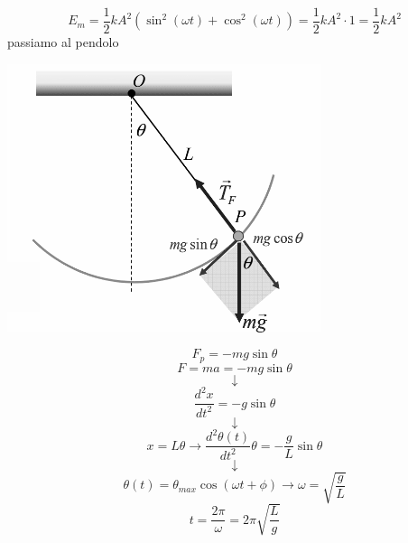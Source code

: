 \documentclass[a4paper,12pt, oneside]{book}
\begin{document}
$$E_m=\frac{1}{2}kA^2(\sin^2(\omega t)+\cos^2(\omega t))=\frac{1}{2}kA^2\cdot 1=\frac{1}{2}kA^2$$
passiamo al pendolo
\begin{center}
\includegraphics[scale=0.6]{img/pen.png}
\end{center}
$$F_p=-mg\sin\theta$$
$$F=ma=-mg\sin\theta $$
$$\downarrow$$
$$\frac{d^2x}{dt^2}=-g\sin\theta$$
$$\downarrow$$
$$x=L\theta\to \frac{d^2\theta(t)}{dt^2}\theta=-\frac{g}{L}\sin\theta$$
$$\downarrow$$
$$\theta(t)=\theta_{max}\cos(\omega t+\phi)\to \omega=\sqrt{\frac{g}{L}}$$
$$t=\frac{2\pi}{\omega}=2\pi\sqrt{\frac{L}{g}}$$
\end{document}

